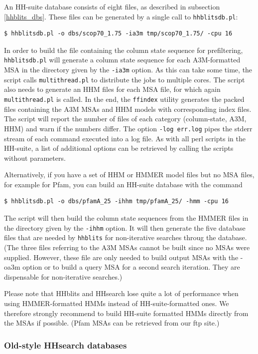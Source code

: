 \documentclass[11pt,a4paper]{article}
\begin{document}
An HH-suite database consists of eight files, as described in subsection \ref{hhblits_dbs}. These files can be generated by a single call to \verb`hhblitsdb.pl`:
\begin{verbatim}
$ hhblitsdb.pl -o dbs/scop70_1.75 -ia3m tmp/scop70_1.75/ -cpu 16
\end{verbatim}
In order to build the file containing the column state sequence for prefiltering, \verb`hhblitsdb.pl` will generate a column state sequence for each A3M-formatted MSA in the directory given by the \verb`-ia3m` option. As this can take some time, the script calls \verb`multithread.pl` to distribute the jobs to multiple cores. The script also needs to generate an HHM files for each MSA file, for which again \verb`multithread.pl` is called. In the end, the \verb`ffindex` utility generates the packed files containing the A3M MSAs and HHM models with corresponding index files. The script will report the number of files of each category (column-state, A3M, HHM) and warn if the numbers differ. The option \verb`-log err.log` pipes the stderr stream of each command executed into a log file. As with all perl scripts in the HH-suite, a list of additional options can be retrieved by calling the scripts without parameters.

Alternatively, if you have a set of HHM or HMMER model files but no MSA files, for example for Pfam, you can build an HH-suite database with the command
\begin{verbatim}
$ hhblitsdb.pl -o dbs/pfamA_25 -ihhm tmp/pfamA_25/ -hmm -cpu 16
\end{verbatim}
The script will then build the column state sequences from the HMMER files in the directory given by the \verb`-ihhm` option. It will then generate the five database files that are needed by \verb`hhblits` for non-iterative searches throug the database. (The three files referring to the A3M MSAs cannot be built since no MSAs were supplied. However, these file are only needed to build output MSAs with the -oa3m option or to build a query MSA for a second search iteration. They are dispensable for non-iterative searches.)

Please note that HHblits and HHsearch lose quite a lot of performance when using HMMER-formatted HMMs instead of HH-suite-formatted ones. We therefore strongly recommend to build HH-suite formatted HMMs directly from the MSAs if possible. (Pfam MSAs can be retrieved from our ftp site.)


\subsubsection*{Old-style HHsearch databases}
\end{document}
